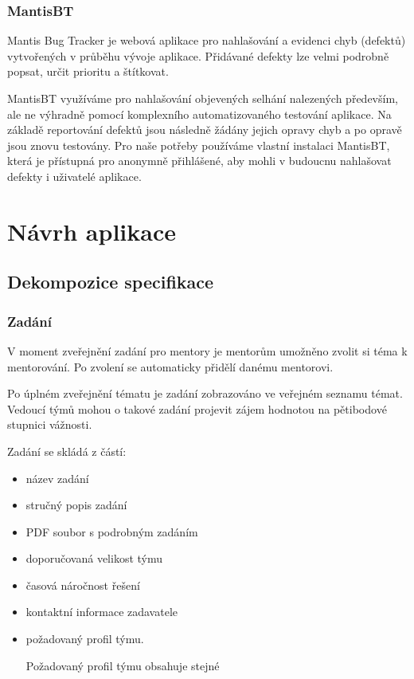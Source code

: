 \documentclass[czech,BP]{thesiskiv}
\begin{document}
\subsection{MantisBT}
	\par Mantis Bug Tracker je webová aplikace pro nahlašování a evidenci chyb (defektů) vytvořených v průběhu vývoje aplikace. Přidávané defekty lze velmi podrobně popsat, určit prioritu a štítkovat.
	\par MantisBT využíváme pro nahlašování objevených selhání nalezených především, ale ne výhradně pomocí komplexního automatizovaného testování aplikace. Na základě reportování defektů jsou následně žádány jejich opravy chyb a po opravě jsou znovu testovány. Pro naše potřeby používáme vlastní instalaci MantisBT, která je přístupná pro anonymně přihlášené, aby mohli v budoucnu nahlašovat defekty i uživatelé aplikace.
\chapter{Návrh aplikace}

	\section{Dekompozice specifikace}
		\subsection{Zadání}
		\par V moment zveřejnění zadání pro mentory je mentorům umožněno zvolit si téma k mentorování. Po zvolení se automaticky přidělí danému mentorovi.
		\par Po úplném zveřejnění tématu je zadání zobrazováno ve veřejném seznamu témat. Vedoucí týmů mohou o takové zadání projevit zájem hodnotou na pětibodové stupnici vážnosti.
		\par Zadání se skládá z částí:
		\begin{itemize}
			\item název zadání
			\item stručný popis zadání
			\item PDF soubor s podrobným zadáním
			\item doporučovaná velikost týmu
			\item časová náročnost řešení
			\item kontaktní informace zadavatele
			\item požadovaný profil týmu.
		\par Požadovaný profil týmu obsahuje stejné 
		\end{itemize}
\end{document}
